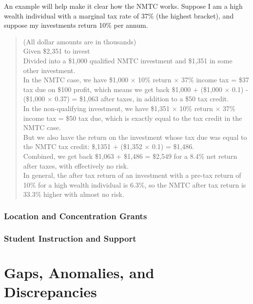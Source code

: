 An example will help make it clear how the NMTC works. Suppose I am a high wealth individual with a marginal tax rate of 37\% (the highest bracket), and suppose my investments return 10\% per annum.
\begin{quotation}\OnehalfSpacing%
  \noindent{}(All dollar amounts are in thousands) \\
  \noindent{}Given \$2,351 to invest \\
  \noindent{}Divided into a \$1,000 qualified NMTC investment and \$1,351 in some other investment. \\
  \noindent{}In the NMTC case, we have \$1,000 $\times$ 10\% return $\times$ 37\% income tax = \$37 tax due on \$100 profit, which means we get back \$1,000 + (\$1,000 $\times$ 0.1) - (\$1,000 $\times$ 0.37) = \$1,063 after taxes, in addition to a \$50 tax credit. \\
  
  \noindent{}In the non-qualifying investment, we have \$1,351 $\times$ 10\% return $\times$ 37\% income tax = \$50 tax due, which is exactly equal to the tax credit in the NMTC case.\\
  \noindent{}But we also have the return on the investment whose tax due was equal to the NMTC tax credit: \$,1351 + (\$1,352 $\times$ 0.1) = \$1,486.\\
  \noindent{}Combined, we get back \$1,063 + \$1,486 = \$2,549 for a 8.4\% net return after taxes, with effectively no risk.
  \\
  In general, the after tax return of an investment with a pre-tax return of 10\% for a high wealth individual is 6.3\%, so the NMTC after tax return is 33.3\% higher with almost no risk.
\end{quotation}

\subsubsection{Location and Concentration Grants}\indent%
\label{sec:location-concentration-grants}

\subsubsection{Student Instruction and Support}\indent%
\label{student_instruction_support}

\section{Gaps,  Anomalies, and Discrepancies}\indent%
\label{sec:gaps_anomolies_discrepencies}

